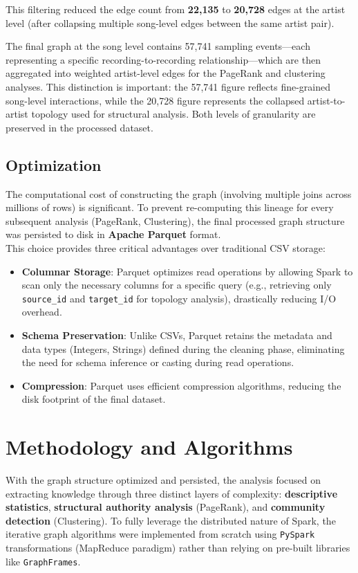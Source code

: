\documentclass[a4paper, 12pt]{article}
\begin{document}
This filtering reduced the edge count from \textbf{22,135} to \textbf{20,728} edges at the artist level (after collapsing multiple song-level edges between the same artist pair).

The final graph at the song level contains 57,741 sampling events—each representing a specific recording-to-recording relationship—which are then aggregated into weighted artist-level edges for the PageRank and clustering analyses. This distinction is important: the 57,741 figure reflects fine-grained song-level interactions, while the 20,728 figure represents the collapsed artist-to-artist topology used for structural analysis. Both levels of granularity are preserved in the processed dataset.



\subsection{Optimization}
The computational cost of constructing the graph (involving multiple joins across millions of rows) is significant. To prevent re-computing this lineage for every subsequent analysis (PageRank, Clustering), the final processed graph structure was persisted to disk in \textbf{Apache Parquet} format.
\\
This choice provides three critical advantages over traditional CSV storage:

\begin{itemize}
    \item \textbf{Columnar Storage}: Parquet optimizes read operations by allowing Spark to scan only the necessary columns for a specific query (e.g., retrieving only \texttt{source\_id} and \texttt{target\_id} for topology analysis), drastically reducing I/O overhead.
    \item \textbf{Schema Preservation}: Unlike CSVs, Parquet retains the metadata and data types (Integers, Strings) defined during the cleaning phase, eliminating the need for schema inference or casting during read operations.
    \item \textbf{Compression}: Parquet uses efficient compression algorithms, reducing the disk footprint of the final dataset.
\end{itemize}

\clearpage

\section{Methodology and Algorithms}
With the graph structure optimized and persisted, the analysis focused on extracting knowledge through three distinct layers of complexity: \textbf{descriptive statistics}, \textbf{structural authority analysis} (PageRank), and \textbf{community detection} (Clustering). To fully leverage the distributed nature of Spark, the iterative graph algorithms were implemented from scratch using \texttt{PySpark} transformations (MapReduce paradigm) rather than relying on pre-built libraries like \texttt{GraphFrames}.
\end{document}
